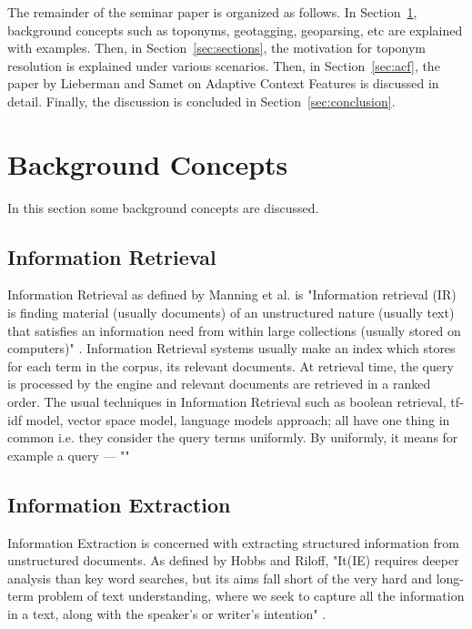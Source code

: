 \documentclass[
     11pt,         %
     a4paper,      %
     oneside,
     ]{article}
\begin{document}
The remainder of the seminar paper is organized as follows. In Section~\ref{sec:background_concepts}, background concepts such as toponyms, geotagging, geoparsing, etc are explained with examples.
Then, in Section~\ref{sec:sections}, the motivation for toponym resolution is explained under various scenarios. Then, in Section~\ref{sec:acf}, the paper by Lieberman and Samet \cite{Lieberman12adaptivecontext} on Adaptive Context Features is discussed in detail. Finally, the discussion is concluded in Section~\ref{sec:conclusion}.

\section{Background Concepts}\label{sec:background_concepts}
In this section some background concepts are discussed.

\subsection{Information Retrieval}
Information Retrieval as defined by Manning et al. is "Information retrieval (IR) is finding material (usually documents) of an unstructured nature (usually text) that satisfies an information need from within large collections (usually stored on computers)" \cite{Manning:2008:IIR:1394399}. Information Retrieval systems usually make an index which stores for each term in the corpus, its relevant documents. At retrieval time, the query is processed by the engine and relevant documents are retrieved in a ranked order. The usual techniques in Information Retrieval such as boolean retrieval, tf-idf model, vector space model, language models approach; all have one thing in common i.e. they consider the query terms uniformly.  By uniformly, it means for example a query --- ""

\subsection{Information Extraction}
Information Extraction is concerned with extracting structured information from unstructured documents. As defined by Hobbs and Riloff, "It(IE) requires deeper analysis than  key word searches, but its aims fall short of the very hard and long-term problem of text understanding, where we seek to capture all the information in a text, along with the speaker's or writer's intention" \cite{hobbs-handbook10}.
\end{document}
